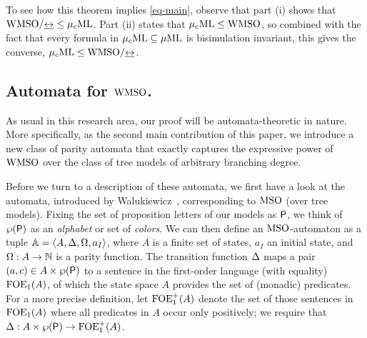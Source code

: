 To see how this theorem implies \eqref{eq-main}, observe that part (i)
shows that $\mathrm{WMSO}/{\mathrel{\underline{\leftrightarrow}}} \leq \mu_{c}\textup{ML}$.
Part (ii) states that $\mu_{c}\textup{ML} \leq \mathrm{WMSO}$, so combined with the fact that
every formula in $\mu_{c}\textup{ML} \subseteq \mu\mathrm{ML}$ is bisimulation invariant, this gives the
converse, $\mu_{c}\textup{ML} \leq \mathrm{WMSO}/{\mathrel{\underline{\leftrightarrow}}}$.



\subsection{Automata for $\mathrm{WMSO}$.}
%
As usual in this research area, our proof will be automata-theoretic in
nature.
More specifically, as the second main contribution of this paper, we
introduce a new class of parity automata that exactly captures the expressive
power of $\mathrm{WMSO}$ over the class of tree models of arbitrary branching degree.

Before we turn to a description of these automata, we first have a look at the
automata, introduced by Walukiewicz~\cite{Walukiewicz96}, corresponding to $\mathrm{MSO}$
(over tree models).
Fixing the set of proposition letters of our models as $\mathsf{P}$, we think of
$\wp(\mathsf{P})$ as an \emph{alphabet} or set of \emph{colors}.
We can then define an $\mathrm{MSO}$-automaton as a tuple $\mathbb{A} = \langle{A,\Delta,\Omega,a_I}\rangle$, where $A$ is a finite set of states, $a_I$ an initial state, and $\Omega:
A \to \mathbb{N}$ is a parity function.
%
The transition function $\Delta$ maps a pair $(a,c) \in A \times \wp(\mathsf{P})$ to a
sentence in the first-order language (with equality) $\mathrm{FOE}_1(A)$, of which the
state space $A$ provides the set of (monadic) predicates.
%
For a more precise definition, let $\mathrm{FOE}_1^+(A)$ denote the set of
those sentences in $\mathrm{FOE}_1(A)$ where all predicates in $A$ occur only positively;
we require that $\Delta: A \times \wp(\mathsf{P}) \to \mathrm{FOE}_1^+(A)$.

